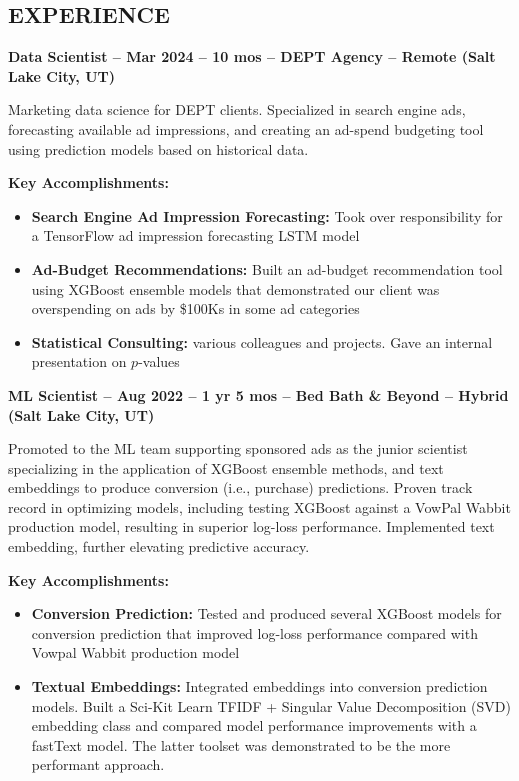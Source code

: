 \documentclass[resmargin, centered, 10pt]{res}
\def \fullwidth{\textwidth}
\newcommand{\tab}[1][1cm]{\hspace*{#1}}
\newcommand{\subtext}[1]{\tab[0.5cm] \parbox{\dimexpr\fullwidth-0.5cm\relax}{#1}}
\begin{document}
\begin{resume}
\section{EXPERIENCE}

\textbf{Data Scientist -- Mar 2024 -- 10 mos -- DEPT Agency -- Remote (Salt Lake City, UT)}

\subtext{Marketing data science for DEPT clients. Specialized in search engine ads, forecasting available ad impressions, and creating an ad-spend budgeting tool using prediction models based on historical data.}

\subtext{\textbf{Key Accomplishments:}}

\begin{itemize}
	\item \textbf{Search Engine Ad Impression Forecasting:} Took over responsibility for a TensorFlow ad impression forecasting LSTM model
	\item \textbf{Ad-Budget Recommendations:} Built an ad-budget recommendation tool using XGBoost ensemble models that demonstrated our client was overspending on ads by \$100Ks in some ad categories
	\item \textbf{Statistical Consulting:} various colleagues and projects. Gave an internal presentation on $p$-values
\end{itemize}

\textbf{ML Scientist -- Aug 2022 -- 1 yr 5 mos -- Bed Bath \& Beyond -- Hybrid (Salt Lake City, UT)}

\subtext{Promoted to the ML team supporting sponsored ads as the junior scientist specializing in the application of XGBoost ensemble methods, and text embeddings to produce conversion (i.e., purchase) predictions. Proven track record in optimizing models, including testing XGBoost against a VowPal Wabbit production model, resulting in superior log-loss performance. Implemented text embedding, further elevating predictive accuracy.}

\subtext{\textbf{Key Accomplishments:}}

\begin{itemize}
	\item \textbf{Conversion Prediction:} Tested and produced several XGBoost models for conversion prediction that improved log-loss performance compared with Vowpal Wabbit production model
	\item \textbf{Textual Embeddings:} Integrated embeddings into conversion prediction models. Built a Sci-Kit Learn TFIDF + Singular Value Decomposition (SVD) embedding class and compared model performance improvements with a fastText model. The latter toolset was demonstrated to be the more performant approach.
\end{itemize}


\end{resume}
\end{document}
